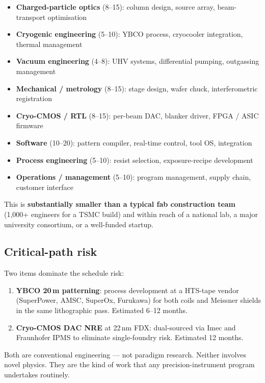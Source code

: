 \documentclass[11pt,letterpaper]{article}
\begin{document}
\begin{itemize}[leftmargin=1.6em]
  \item \textbf{Charged-particle optics} (8--15): column design, source array, beam-transport optimisation
  \item \textbf{Cryogenic engineering} (5--10): YBCO process, cryocooler integration, thermal management
  \item \textbf{Vacuum engineering} (4--8): UHV systems, differential pumping, outgassing management
  \item \textbf{Mechanical / metrology} (8--15): stage design, wafer chuck, interferometric registration
  \item \textbf{Cryo-CMOS / RTL} (8--15): per-beam DAC, blanker driver, FPGA / ASIC firmware
  \item \textbf{Software} (10--20): pattern compiler, real-time control, tool OS, integration
  \item \textbf{Process engineering} (5--10): resist selection, exposure-recipe development
  \item \textbf{Operations / management} (5--10): program management, supply chain, customer interface
\end{itemize}

This is \textbf{substantially smaller than a typical fab construction team} (1{,}000+ engineers for a TSMC build) and within reach of a national lab, a major university consortium, or a well-funded startup.

\subsection{Critical-path risk}

Two items dominate the schedule risk:

\begin{enumerate}[leftmargin=1.6em]
  \item \textbf{YBCO 20\,\textmu m patterning}: process development at a HTS-tape vendor (SuperPower, AMSC, SuperOx, Furukawa) for both coils and Meissner shields in the same lithographic pass. Estimated 6--12 months.
  \item \textbf{Cryo-CMOS DAC NRE} at 22\,nm FDX: dual-sourced via Imec and Fraunhofer IPMS to eliminate single-foundry risk. Estimated 12 months.
\end{enumerate}

Both are conventional engineering --- not paradigm research. Neither involves novel physics. They are the kind of work that any precision-instrument program undertakes routinely.
\end{document}
